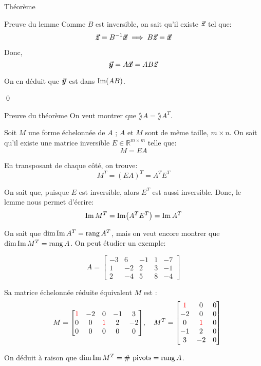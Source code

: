 \documentclass[a4paper]{article}
\begin{document}
\begin{parag}{Théorème}
\begin{subparag}{Preuve du lemme}
        Comme $B$ est inversible, on sait qu'il existe $\bm{\protect\vec{z}}$ tel que:
        \[\bm{\protect\vec{z}} = B^{-1} \bm{\protect\vec{x}} \implies B \bm{\protect\vec{z}} = \bm{\protect\vec{x}}\]

        Donc,
        \[\bm{\protect\vec{y}} = A \bm{\protect\vec{x}} = AB \bm{\protect\vec{z}}\]

        On en déduit que $\bm{\protect\vec{y}}$ est dans $\operatorname{Im}(AB)$.

        \qed
    \end{subparag}

    \begin{subparag}{Preuve du théorème}
        On veut montrer que $\rang A = \rang A^T$.

        Soit $M$ une forme échelonnée de $A$ ; $A$ et $M$ sont de même taille, $m \times n$. On sait qu'il existe une matrice inversible $E \in\mathbb{R}^{m\times m}$ telle que:
        \[M = E A\]

        En transposant de chaque côté, on trouve:
        \[M^T = \left(EA\right)^T = A^T E^T\]

        On sait que, puisque $E$ est inversible, alors $E^{T}$ est aussi inversible. Donc, le lemme nous permet d'écrire:
        \[\im M^T = \im\left(A^T E^T\right) = \im A^T\]

        On sait que $\dim\operatorname{Im} A^T = \operatorname{rang} A^T$, mais on veut encore montrer que $\dim \operatorname{Im} M^T = \operatorname{rang} A$. On peut étudier un exemple:

        \[A = \begin{bmatrix} -3 & 6 & -1 & 1 & -7 \\ 1 & -2 & 2 & 3 & -1 \\ 2 & -4 & 5 & 8 & -4 \end{bmatrix}\]

        Sa matrice échelonnée réduite équivalent $M$ est :
        \[\mathspace M = \begin{bmatrix} {\color{red}1} & -2 & 0 & -1 & 3 \\ 0 & 0 & {\color{red}1} & 2 & -2 \\ 0 & 0 & 0 & 0 & 0 \end{bmatrix}, \mathspace M^T = \begin{bmatrix} {\color{red}1} & 0 & 0 \\ -2 & 0 & 0 \\ 0 & {\color{red}1} & 0 \\ -1 & 2 & 0 \\ 3 & -2 & 0 \end{bmatrix}\]

        On déduit à raison que $\dim\operatorname{Im} M^T = \text{\# pivots} = \operatorname{rang} A$.


\end{subparag}
\end{parag}
\end{document}
